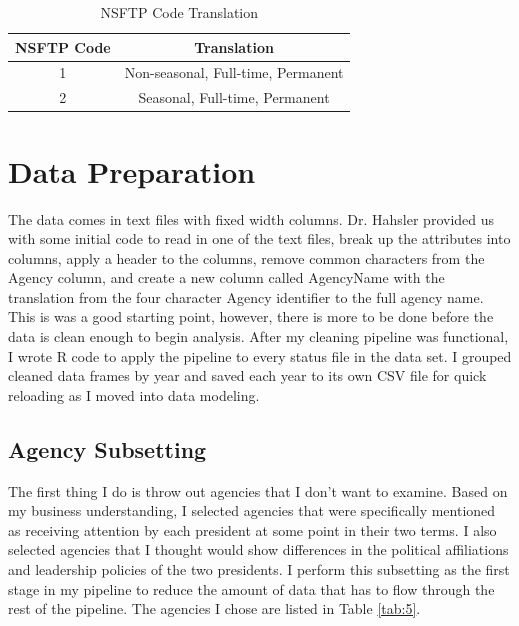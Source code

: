 \documentclass{article}
\begin{document}
        \begin{center}
            \begin{table}
                \centering
                \begin{tabular}{ |c|c| }
                    \hline
                    NSFTP Code & Translation \\
                    \hline
                    1 & Non-seasonal, Full-time, Permanent \\
                    2 & Seasonal, Full-time, Permanent \\
                    \hline
                \end{tabular}
                \caption{NSFTP Code Translation}
                \label{tab:4}
            \end{table}
        \end{center}

\section{Data Preparation}
The data comes in text files with fixed width columns. Dr. Hahsler provided us with some initial code to read in one of the text files, break up the attributes into columns, apply a header to the columns, remove common characters from the Agency column, and create a new column called AgencyName with the translation from the four character Agency identifier to the full agency name. This is was a good starting point, however, there is more to be done before the data is clean enough to begin analysis. After my cleaning pipeline was functional, I wrote R code to apply the pipeline to every status file in the data set. I grouped cleaned data frames by year and saved each year to its own CSV file for quick reloading as I moved into data modeling.

    \subsection{Agency Subsetting}
    The first thing I do is throw out agencies that I don't want to examine. Based on my business understanding, I selected agencies that were specifically mentioned as receiving attention by each president at some point in their two terms. I also selected agencies that I thought would show differences in the political affiliations and leadership policies of the two presidents. I perform this subsetting as the first stage in my pipeline to reduce the amount of data that has to flow through the rest of the pipeline. The agencies I chose are listed in Table \ref{tab:5}.
\end{document}
